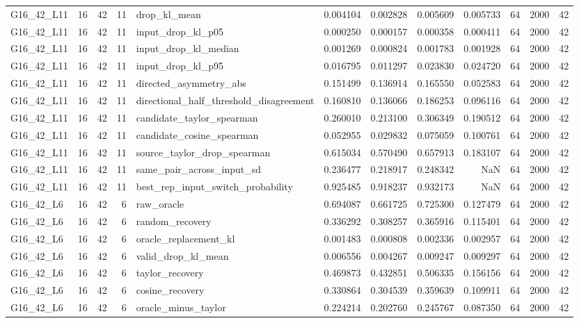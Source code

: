 \begin{tabular}{lrlrlrrrrrrr}
G16_42_L11 & 16 & 42 & 11 & drop_kl_mean & 0.004104 & 0.002828 & 0.005609 & 0.005733 & 64 & 2000 & 42 \\
G16_42_L11 & 16 & 42 & 11 & input_drop_kl_p05 & 0.000250 & 0.000157 & 0.000358 & 0.000411 & 64 & 2000 & 42 \\
G16_42_L11 & 16 & 42 & 11 & input_drop_kl_median & 0.001269 & 0.000824 & 0.001783 & 0.001928 & 64 & 2000 & 42 \\
G16_42_L11 & 16 & 42 & 11 & input_drop_kl_p95 & 0.016795 & 0.011297 & 0.023830 & 0.024720 & 64 & 2000 & 42 \\
G16_42_L11 & 16 & 42 & 11 & directed_asymmetry_abs & 0.151499 & 0.136914 & 0.165550 & 0.052583 & 64 & 2000 & 42 \\
G16_42_L11 & 16 & 42 & 11 & directional_half_threshold_disagreement & 0.160810 & 0.136066 & 0.186253 & 0.096116 & 64 & 2000 & 42 \\
G16_42_L11 & 16 & 42 & 11 & candidate_taylor_spearman & 0.260010 & 0.213100 & 0.306349 & 0.190512 & 64 & 2000 & 42 \\
G16_42_L11 & 16 & 42 & 11 & candidate_cosine_spearman & 0.052955 & 0.029832 & 0.075059 & 0.100761 & 64 & 2000 & 42 \\
G16_42_L11 & 16 & 42 & 11 & source_taylor_drop_spearman & 0.615034 & 0.570490 & 0.657913 & 0.183107 & 64 & 2000 & 42 \\
G16_42_L11 & 16 & 42 & 11 & same_pair_across_input_sd & 0.236477 & 0.218917 & 0.248342 & NaN & 64 & 2000 & 42 \\
G16_42_L11 & 16 & 42 & 11 & best_rep_input_switch_probability & 0.925485 & 0.918237 & 0.932173 & NaN & 64 & 2000 & 42 \\
G16_42_L6 & 16 & 42 & 6 & raw_oracle & 0.694087 & 0.661725 & 0.725300 & 0.127479 & 64 & 2000 & 42 \\
G16_42_L6 & 16 & 42 & 6 & random_recovery & 0.336292 & 0.308257 & 0.365916 & 0.115401 & 64 & 2000 & 42 \\
G16_42_L6 & 16 & 42 & 6 & oracle_replacement_kl & 0.001483 & 0.000808 & 0.002336 & 0.002957 & 64 & 2000 & 42 \\
G16_42_L6 & 16 & 42 & 6 & valid_drop_kl_mean & 0.006556 & 0.004267 & 0.009247 & 0.009297 & 64 & 2000 & 42 \\
G16_42_L6 & 16 & 42 & 6 & taylor_recovery & 0.469873 & 0.432851 & 0.506335 & 0.156156 & 64 & 2000 & 42 \\
G16_42_L6 & 16 & 42 & 6 & cosine_recovery & 0.330864 & 0.304539 & 0.359639 & 0.109911 & 64 & 2000 & 42 \\
G16_42_L6 & 16 & 42 & 6 & oracle_minus_taylor & 0.224214 & 0.202760 & 0.245767 & 0.087350 & 64 & 2000 & 42 \\

\end{tabular}
